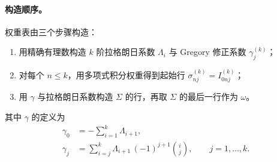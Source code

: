\paragraph{构造顺序。}
权重表由三个步骤构造：
\begin{enumerate}[label=(\arabic*)]
    \item 用精确有理数构造 $k$ 阶拉格朗日系数 $\Lambda_i$ 与
          Gregory 修正系数 $\gamma^{(k)}_j$；
    \item 对每个 $n\le k$，用多项式积分权重得到起始行
          $\sigma^{(k)}_{nj} = I^{(k)}_{0nj}$；
    \item 用 $\gamma$ 与拉格朗日系数构造 $\Sigma$ 的行，再取
          $\Sigma$ 的最后一行作为 $\omega$。
\end{enumerate}
其中 $\gamma$ 的定义为
\begin{align}
    \gamma_0 &= -\sum^{k}_{i=1}\Lambda_{i+1}, \\
    \gamma_j &= \sum^{k}_{i=j}\Lambda_{i+1}\,(-1)^{j+1}\binom{i}{j},
    \qquad j=1,\dots,k .
\end{align}

